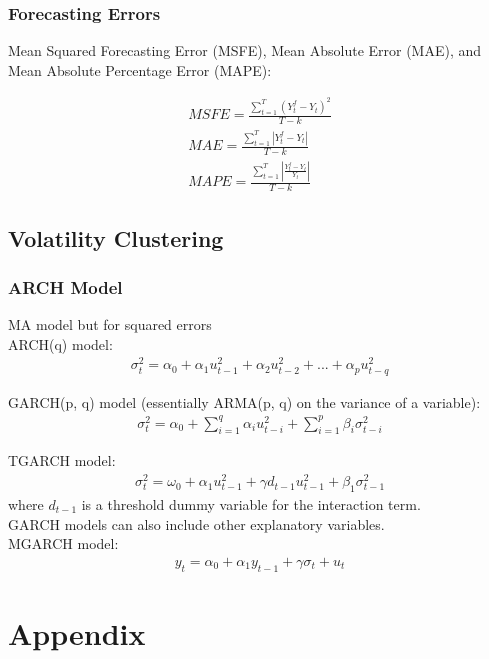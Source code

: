 \documentclass[12pt]{article}
\numberwithin{equation}{section}
\begin{document}
\subsubsection{Forecasting Errors}
Mean Squared Forecasting Error (MSFE), Mean Absolute Error (MAE), and Mean Absolute Percentage Error (MAPE):

\begin{gather}
    MSFE = \frac{\sum\limits_{t=1}^{T} (Y_t^f - Y_t)^2}{T-k} \\
    MAE = \frac{\sum\limits_{t=1}^{T} |Y_t^f - Y_t|}{T-k} \\
    MAPE = \frac{\sum\limits_{t=1}^{T} |\frac{Y_t^f - Y_t}{Y_t}|}{T-k}
\end{gather}

\subsection{Volatility Clustering}

\subsubsection{ARCH Model}
MA model but for squared errors \\[0.5cm]
ARCH(q) model:
\begin{gather}
    \sigma_t^2 = \alpha_0 + \alpha_1 u_{t-1}^2 + \alpha_2 u_{t-2}^2 + ... + \alpha_p u_{t-q}^2
\end{gather}

GARCH(p, q) model (essentially ARMA(p, q) on the variance of a variable):
\begin{gather}
    \sigma_t^2 = \alpha_0 + \sum_{i=1}^q \alpha_i u_{t-i}^2 + \sum_{i=1}^p \beta_i \sigma_{t-i}^2
\end{gather}

TGARCH model:
\begin{gather}
    \sigma_t^2 = \omega_0 + \alpha_1 u_{t-1}^2 + \gamma d_{t-1} u_{t-1}^2 + \beta_1 \sigma_{t-1}^2
\end{gather}
where $d_{t-1}$ is a threshold dummy variable for the interaction term. \\[0.5cm]
GARCH models can also include other explanatory variables. \\[0.5cm]
MGARCH model:
\begin{gather}
    y_t = \alpha_0 + \alpha_1 y_{t-1} + \gamma \sigma_t + u_t
\end{gather}

\section{Appendix}
\label{sec:appendix}
\end{document}
